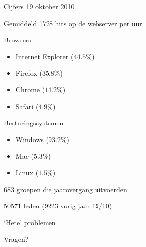 \documentclass[chiro,pdf]{prosper}
\begin{document}
{
\begin{slide}{Cijfers 19 oktober 2010}

\begin{itemstep}
\item Gemiddeld 1728 hits op de webserver per uur
\item Browsers
\begin{itemize}
\item Internet Explorer ($44.5 \%$)
\item Firefox ($35.8 \%$)
\item Chrome ($14.2 \%$)
\item Safari ($4.9 \%$)
\end{itemize}
\item Besturingssystemen
\begin{itemize}
\item Windows ($93.2 \%$)
\item Mac ($5.3 \%$)
\item Linux ($1.5 \%$)
\end{itemize}
\item{683 groepen die jaarovergang uitvoerden}
\item{50571 leden (9223 vorig jaar 19/10)}
\end{itemstep}

\end{slide}
}

%
%

{
\begin{slide}{`Hete' problemen}
\begin{itemize}
\end{itemize}
\end{slide}
}


%
%

\begin{slide}{Vragen?}
\end{slide}
\end{document}
